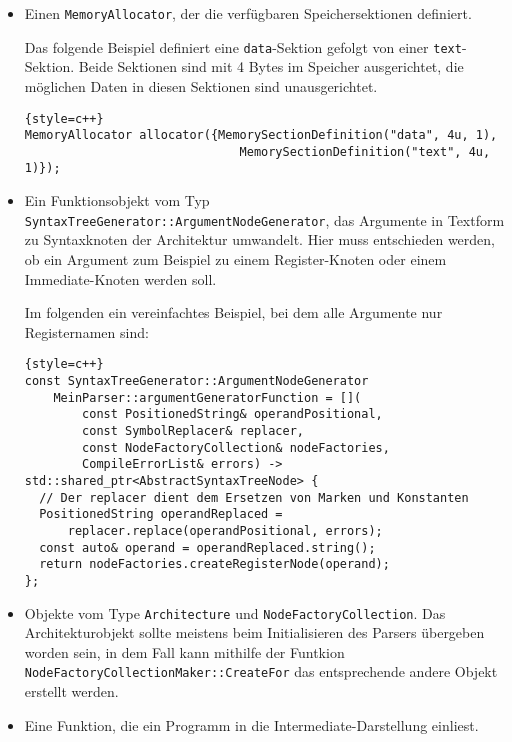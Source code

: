 \begin{itemize}
\item Einen \texttt{Memory\-Allocator}, der die verfügbaren
Speichersektionen definiert.

Das folgende Beispiel definiert eine \texttt{data}-Sektion gefolgt von einer
\texttt{text}-Sektion. Beide Sektionen sind mit 4 Bytes im Speicher ausgerichtet,
die möglichen Daten in diesen Sektionen sind unausgerichtet.

\begin{lstlisting}{style=c++}
MemoryAllocator allocator({MemorySectionDefinition("data", 4u, 1),
                              MemorySectionDefinition("text", 4u, 1)});
\end{lstlisting}

\item Ein Funktionsobjekt vom Typ
\texttt{Syntax\-Tree\-Generator::\allowbreak{}Argument\-Node\-Generator}, das
Argumente in Textform zu Syntaxknoten der Architektur umwandelt. Hier muss
entschieden werden, ob ein Argument zum Beispiel zu einem Register-Knoten oder
einem Immediate-Knoten werden soll.

Im folgenden ein vereinfachtes Beispiel, bei dem alle Argumente nur
Registernamen sind:

\begin{lstlisting}{style=c++}
const SyntaxTreeGenerator::ArgumentNodeGenerator
    MeinParser::argumentGeneratorFunction = [](
        const PositionedString& operandPositional,
        const SymbolReplacer& replacer,
        const NodeFactoryCollection& nodeFactories,
        CompileErrorList& errors) -> std::shared_ptr<AbstractSyntaxTreeNode> {
  // Der replacer dient dem Ersetzen von Marken und Konstanten
  PositionedString operandReplaced =
      replacer.replace(operandPositional, errors);
  const auto& operand = operandReplaced.string();
  return nodeFactories.createRegisterNode(operand);
};
\end{lstlisting}

\item Objekte vom Type \texttt{Architecture} und
\texttt{Node\-Factory\-Collection}. Das Architekturobjekt sollte meistens beim
Initialisieren des Parsers übergeben worden sein, in dem Fall kann mithilfe der
Funtkion \texttt{Node\-Factory\-Collection\-Maker::\allowbreak{}Create\-For} das
entsprechende andere Objekt erstellt werden.

\item Eine Funktion, die ein Programm in die Intermediate-Darstellung einliest.

\end{itemize}

